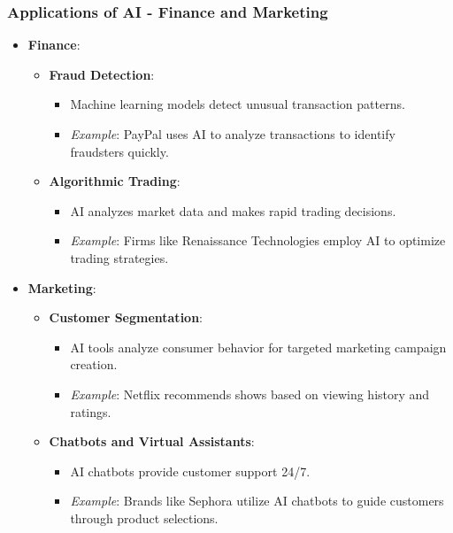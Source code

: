 \documentclass{beamer}
\begin{document}
\begin{frame}[fragile]
    \frametitle{Applications of AI - Finance and Marketing}
    \begin{itemize}
        \item \textbf{Finance}:
        \begin{itemize}
            \item \textbf{Fraud Detection}:
            \begin{itemize}
                \item Machine learning models detect unusual transaction patterns.
                \item \textit{Example}: PayPal uses AI to analyze transactions to identify fraudsters quickly.
            \end{itemize}
            
            \item \textbf{Algorithmic Trading}:
            \begin{itemize}
                \item AI analyzes market data and makes rapid trading decisions.
                \item \textit{Example}: Firms like Renaissance Technologies employ AI to optimize trading strategies.
            \end{itemize}
        \end{itemize}
        
        \item \textbf{Marketing}:
        \begin{itemize}
            \item \textbf{Customer Segmentation}:
            \begin{itemize}
                \item AI tools analyze consumer behavior for targeted marketing campaign creation.
                \item \textit{Example}: Netflix recommends shows based on viewing history and ratings.
            \end{itemize}
        
            \item \textbf{Chatbots and Virtual Assistants}:
            \begin{itemize}
                \item AI chatbots provide customer support 24/7.
                \item \textit{Example}: Brands like Sephora utilize AI chatbots to guide customers through product selections.
            \end{itemize}
        \end{itemize}
    \end{itemize}
\end{frame}
\end{document}
